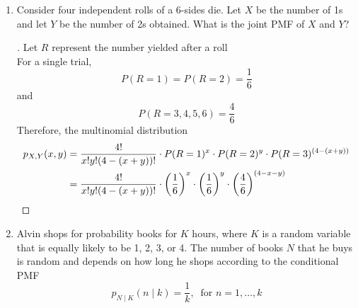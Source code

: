 \documentclass[paper=usletter, fontsize=12pt]{article}
\begin{document}
\begin{enumerate}[label=\textbf{\arabic*}.]
        \item
        Consider four independent rolls of a 6-sides die. Let $X$ be the number
        of 1s and let $Y$ be the number of 2s obtained. What is the joint PMF
        of $X$ and $Y$?
        \begin{proof}[\unskip\nopunct]
            Let $R$ represent the number yielded after a roll\\
            For a single trial,
            \begin{equation*}
                P(R=1) = P(R=2) = \frac{1}{6}
            \end{equation*}
            and
            \begin{equation*}
                P(R=3,4,5,6) = \frac{4}{6}
            \end{equation*}
            Therefore, the multinomial distribution
            \begingroup
            \addtolength{\jot}{1em}
            \begin{align*}
                p_{X,Y}(x,y) &= \frac{4!}{x!y!(4-(x+y))!} \cdot P(R=1)^{x} \cdot P(R=2)^{y} \cdot P(R=3)^{(4-(x+y))} \\
                & = \frac{4!}{x!y!(4-(x+y))!} \cdot \bigg( \frac{1}{6} \bigg)^{x} \cdot \bigg( \frac{1}{6} \bigg)^{y} \cdot \bigg( \frac{4}{6} \bigg)^{(4-x-y)} \qedhere
            \end{align*}
            \endgroup
        \end{proof}
        \vspace{0.2in}

        \item
        Alvin shops for probability books for $K$ hours, where $K$ is a random
        variable that is equally likely to be 1, 2, 3, or 4. The number of
        books $N$ that he buys is random and depends on how long he shops
        according to the conditional PMF
        \begin{equation*}
            p_{N \mid K}(n \mid k) = \frac{1}{k}, \ \text{ for } n=1,\ldots,k
        \end{equation*}
        \begin{enumerate}[label=(\alph*)]


\end{enumerate}
\end{enumerate}
\end{document}
